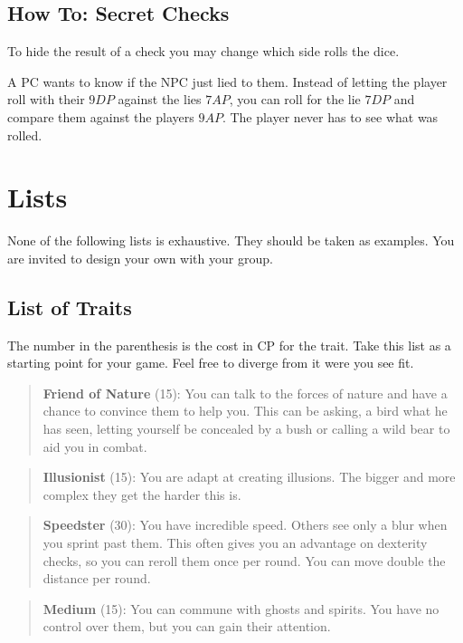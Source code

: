 \documentclass[11pt]{article}
\begin{document}
{\subsection{How To: Secret Checks}
\label{sec:orgc890392}
To hide the result of a check you may change which side rolls the dice.

\begin{pwexample}
A PC wants to know if the NPC just lied to them. Instead of letting the player roll with their \(9 DP\) against the lies \(7 AP\), you can roll for the lie \(7 DP\) and compare them against the players \(9 AP\). The player never has to see what was rolled.
\end{pwexample}
\section{Lists}
\label{sec:org6590d41}
None of the following lists is exhaustive. They should be taken as examples. You are invited to design your own with your group.
\subsection{List of Traits}
\label{sec:orgc8e3cb8}
The number in the parenthesis is the cost in CP for the trait. Take this list as a starting point for your game. Feel free to diverge from it were you see fit.

\begin{quote}
\textbf{Friend of Nature} (15): You can talk to the forces of nature and have a chance to convince them to help you. This can be asking, a bird what he has seen, letting yourself be concealed by a bush or calling a wild bear to aid you in combat.
\end{quote}

\begin{quote}
\textbf{Illusionist} (15): You are adapt at creating illusions. The bigger and more complex they get the harder this is.
\end{quote}

\begin{quote}
\textbf{Speedster} (30): You have incredible speed. Others see only a blur when you sprint past them. This often gives you an advantage on dexterity checks, so you can reroll them once per round. You can move double the distance per round.
\end{quote}

\begin{quote}
\textbf{Medium} (15): You can commune with ghosts and spirits. You have no control over them, but you can gain their attention.
\end{quote}

}
\end{document}
